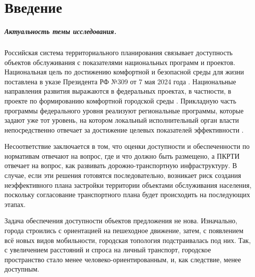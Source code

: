 \chapter*{Введение}

\renewcommand{\chaptername}{Глава}
\renewcommand{\appendixname}{Приложение}
\renewcommand{\listfigurename}{Список рисунков}
\renewcommand{\listtablename}{Список таблиц}
\renewcommand{\bibname}{Список литературы}

\paragraph*{Актуальность темы исследования.}
Российская система территориального планирования связывает доступность объектов обслуживания с показателями национальных программ и проектов. Национальная цель по достижению комфортной и безопасной среды для жизни поставлена в указе Президента РФ №309 от 7 мая 2024 года \cite{rfDecree309_2024}. Национальные направления развития выражаются в федеральных проектах, в частности, в проекте по формированию комфортной городской среды \cite{federalProjectFkgsPassport}. Прикладную часть программы федерального уровня реализуют региональные программы, которые задают уже тот уровень, на котором локальный исполнительный орган власти непосредственно отвечает за достижение целевых показателей эффективности \cite{spbRegionalFkgs}.

Несоответствие заключается в том, что оценки доступности и обеспеченности по нормативам отвечают на вопрос, где и что должно быть размещено, а ПКРТИ отвечает на вопрос, как развивать дорожно-транспортную инфраструктуру. В случае, если эти решения готовятся последовательно, возникает риск создания неэффективного плана застройки территории объектами обслуживания населения, поскольку согласование транспортного плана будет происходить на последующих этапах.

Задача обеспечения доступности объектов предложения не нова. Изначально, города строились с ориентацией на пешеходное движение, затем, с появлением всё новых видов мобильности, городская топология подстраивалась под них. Так, с увеличением расстояний и спроса на личный транспорт, городское пространство стало менее человеко-ориентированным, и, как следствие, менее доступным.


